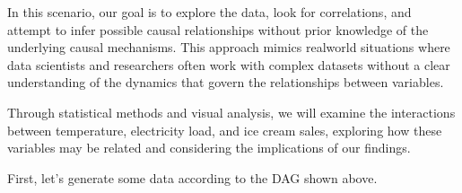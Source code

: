 \documentclass[letterpaper,10pt,english]{jupyterBook}
\begin{document}
\sphinxAtStartPar
In this scenario, our goal is to explore the data, look for correlations, and attempt to infer possible causal relationships without prior knowledge of the underlying causal mechanisms. This approach mimics real\sphinxhyphen{}world situations where data scientists and researchers often work with complex datasets without a clear understanding of the dynamics that govern the relationships between variables.

\sphinxAtStartPar
Through statistical methods and visual analysis, we will examine the interactions between temperature, electricity load, and ice cream sales, exploring how these variables may be related and considering the implications of our findings.

\sphinxAtStartPar
First, let’s generate some data according to the DAG shown above.
\end{document}
